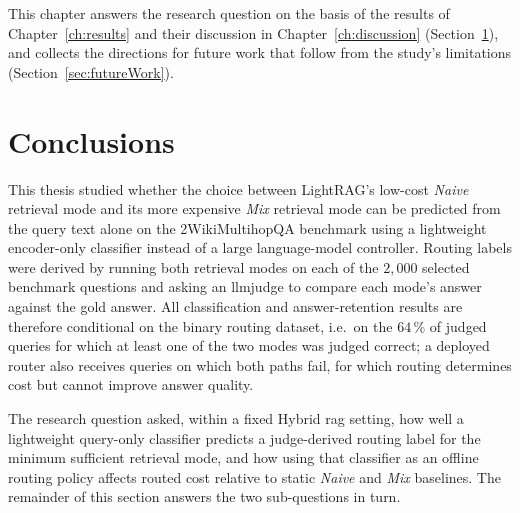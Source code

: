 \documentclass[english, bibtex]{kththesis}               %
\numberwithin{listing}{chapter}
\begin{document}
This chapter answers the research question on the basis of the results of Chapter~\ref{ch:results} and their discussion in Chapter~\ref{ch:discussion} (Section~\ref{sec:conclusions}), and collects the directions for future work that follow from the study's limitations (Section~\ref{sec:futureWork}).

\section{Conclusions}
\label{sec:conclusions}

This thesis studied whether the choice between LightRAG's low-cost \emph{Naive} retrieval mode and its more expensive \emph{Mix} retrieval mode can be predicted from the query text alone on the 2WikiMultihopQA benchmark using a lightweight encoder-only classifier instead of a large language-model controller. Routing labels were derived by running both retrieval modes on each of the $2{,}000$ selected benchmark questions and asking an \gls{llmjudge} \cite{zheng2023judge} to compare each mode's answer against the gold answer. All classification and answer-retention results are therefore conditional on the binary routing dataset, i.e.\ on the $64\,\%$ of judged queries for which at least one of the two modes was judged correct; a deployed router also receives queries on which both paths fail, for which routing determines cost but cannot improve answer quality.

The research question asked, within a fixed Hybrid \gls{rag} setting, how well a lightweight query-only classifier predicts a judge-derived routing label for the minimum sufficient retrieval mode, and how using that classifier as an offline routing policy affects routed cost relative to static \emph{Naive} and \emph{Mix} baselines. The remainder of this section answers the two sub-questions in turn.
\end{document}
